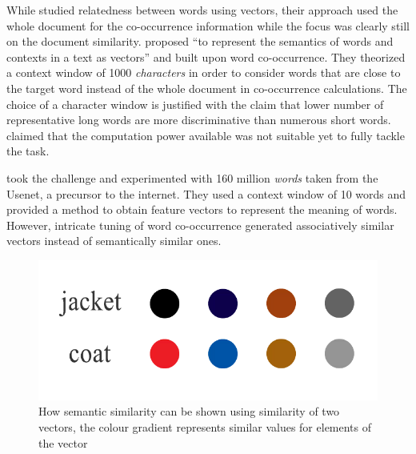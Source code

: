 While \citeauthor{deerwester_indexing_1990} studied relatedness between words using vectors, their approach used the whole document for the co-occurrence information while the focus was clearly still on the document similarity.
\textcite{schutze_dimensions_1992} proposed \enquote{to represent the semantics of words and contexts in a text as vectors} and built upon word co-occurrence.
They theorized a context window of 1000 \emph{characters} in order to consider words that are close to the target word instead of the whole document in co-occurrence calculations.
The choice of a character window is justified with the claim that lower number of representative long words are more discriminative than numerous short words.
\citeauthor{schutze_dimensions_1992} claimed that the computation power available was not suitable yet to fully tackle the task.

\textcite{lund_producing_1996} took the challenge and experimented with 160 million \emph{words} taken from the Usenet, a precursor to the internet.
They used a context window of 10 words and provided a method to obtain feature vectors to represent the meaning of words.
However, intricate tuning of word co-occurrence generated associatively similar vectors instead of semantically similar ones.

\begin{figure}[htbp]
    \centering
    \includegraphics[page=1,width=\textwidth]{Figures/jacket_coat.pdf}
    \caption{How semantic similarity can be shown using similarity of two vectors, the colour gradient represents similar values for elements of the vector}%
    \label{fig:jacket_coat}
\end{figure}

